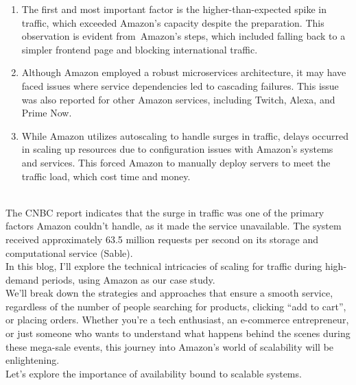 \begin{enumerate}
\item
\protect{}\label{4UecELq6Ffk2MTgdSGMa4}
The first and most important factor is the higher-than-expected spike in traffic, which exceeded Amazon's capacity despite the preparation. This observation is evident from~Amazon's steps, which included falling back to a simpler frontend page and blocking international traffic.
\item
\protect{}\label{O0-fo5nlNmwd23eEucccn}
Although Amazon employed a robust microservices architecture, it may have faced issues where service dependencies led to cascading failures. This issue was also reported for other Amazon services, including Twitch, Alexa, and Prime Now.
\item
\protect{}\label{W_BmIL-PtM1q8I-OLUbDG}
While Amazon utilizes autoscaling to handle surges in traffic, delays occurred in scaling up resources due to configuration issues with Amazon's systems and services. This forced Amazon to manually deploy servers to meet the traffic load, which cost time and money.
\end{enumerate}
\\
The CNBC report indicates that the surge in traffic was one of the primary factors Amazon couldn't handle, as it made the service unavailable. The system received approximately 63.5 million requests per second on its storage and computational service (Sable).
\\
In this blog, I'll explore the technical intricacies of scaling for traffic during high-demand periods, using Amazon as our case study.
\\
We'll break down the strategies and approaches that ensure a smooth service, regardless of the number of people searching for products, clicking ``add to cart'', or placing orders. Whether you're a tech enthusiast, an e-commerce entrepreneur, or just someone who wants to understand what happens behind the scenes during these mega-sale events, this journey into Amazon's world of scalability will be enlightening.
\\
Let's explore the importance of availability bound to scalable systems.

